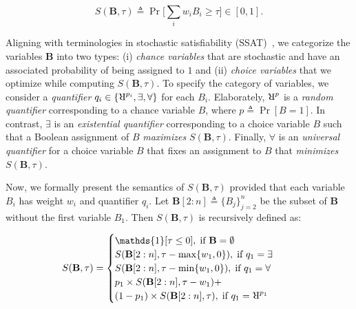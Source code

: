 \[S(\mathbf{B}, \tau) \triangleq \Pr\Big[\sum_{i} w_iB_i \ge \tau \Big] \in [0,1].\]

Aligning with terminologies in stochastic satisfiability (SSAT)~\cite{littman2001stochastic}, we categorize the variables $ \mathbf{B} $ into two types: (i) \textit{chance variables} that are stochastic and have an associated probability of being assigned to $ 1 $ and (ii) \textit{choice variables} that we  optimize while computing $ S(\mathbf{B}, \tau) $.  To specify the category of variables, we consider a \textit{quantifier} $ q_i \in \{\R^{p_i}, \exists, \forall\} $ for each $ B_i $. Elaborately, $ \R^{p} $ is a \textit{random quantifier} corresponding to a chance variable $ B $, where  $ p\triangleq \Pr[B = 1]$. In contrast, $ \exists $ is an \textit{existential quantifier} corresponding to a choice variable $ B $ such that a Boolean assignment of $ B $  \textit{maximizes}  $ S(\mathbf{B}, \tau) $. Finally, $ \forall $ is an \textit{universal quantifier} for a choice variable $ B $ that fixes an assignment to $ B $ that \textit{minimizes} $ S(\mathbf{B}, \tau) $. 
 
Now, we formally present the semantics of $ S(\mathbf{B}, \tau) $ provided that each variable $ B_i $ has weight $ w_i $ and quantifier $ q_i $. Let  $ \mathbf{B}[2:n] \triangleq \{B_j\}_{j=2}^{n} $ be the subset of $\mathbf{B}$ without the first variable $ B_1 $. Then $ S(\mathbf{B}, \tau) $ is recursively defined as:


\begin{align}\label{fairness_fvgm_eq:semantics_recurse}
 \hspace*{-1.2em} S(\mathbf{B},\tau) =
 \begin{cases}
 \mathds{1}[ \tau \le 0 ], \; \text{if } \textbf{B} = \emptyset \\
 S(\mathbf{B}[2:n],\tau - \max\{w_1, 0\}), \; \text{if } q_1 = \exists\\
 S(\mathbf{B}[2:n],\tau - \min\{w_1, 0\}), \; \text{if } q_1 = \forall\\
 p_1\times S(\mathbf{B}[2:n],\tau - w_1) +\\ (1-p_1)\times S(\mathbf{B}[2:n],\tau),\; \text{if } q_1 = \R^{p_1}
 \end{cases}
\end{align} 



